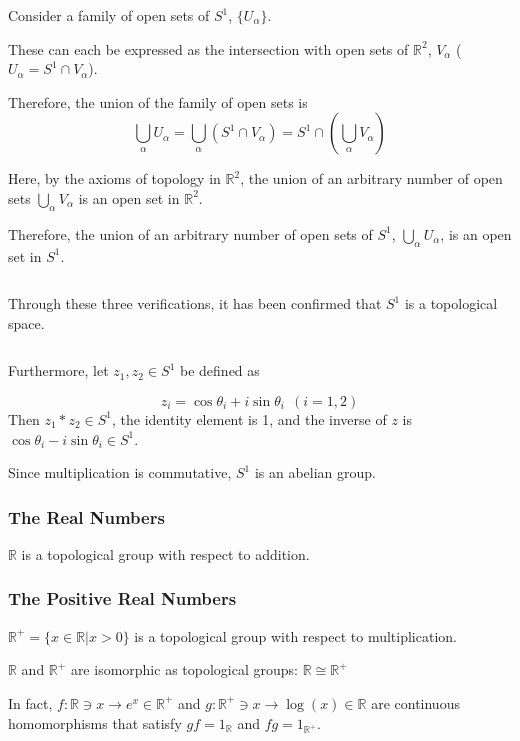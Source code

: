 \documentclass[uplatex,a4j,12pt,dvipdfmx]{jsarticle}
\begin{document}
Consider a family of open sets of $S^{1}$, $\{ U_{\alpha} \}$.

These can each be expressed as the intersection with open sets of $\mathbb{R}^{2}$,
$V_{\alpha}$ ($U_{\alpha}=S^{1} \cap V_{\alpha}$).

Therefore, the union of the family of open sets is
\[
	\bigcup_{\alpha} U_{\alpha}
	=
	\bigcup_{\alpha} (S^{1} \cap V_{\alpha})
	=
	S^{1} \cap \left( \bigcup_{\alpha} V_{\alpha} \right)
\]

Here, by the axioms of topology in $\mathbb{R}^{2}$,
the union of an arbitrary number of open sets
$\bigcup_{\alpha} V_{\alpha}$
is an open set in $\mathbb{R}^{2}$.

Therefore,
the union of an arbitrary number of open sets of $S^{1}$,
$\bigcup_{\alpha} U_{\alpha}$, is an open set in $S^{1}$.

	${}$

Through these three verifications, it has been confirmed that $S^{1}$ is a topological space.

	${}$

Furthermore, let $z_{1},z_{2} \in S^{1}$ be defined as

\[
	z_{i} = \cos \theta_{i} + i \sin \theta_{i} \ \ (i=1,2)
\]
Then $z_{1} * z_{2} \in S^{1}$, the identity element is 1, and the inverse of $z$ is $\cos \theta_{i} - i \sin \theta_{i} \in S^{1}$.

Since multiplication is commutative, $S^{1}$ is an abelian group.

\subsubsection{The Real Numbers}

$\mathbb{R}$ is a topological group with respect to addition.

\subsubsection{The Positive Real Numbers}

$\mathbb{R}^{+} = \{ x \in \mathbb{R} | x > 0 \}$
is a topological group with respect to multiplication.

$\mathbb{R}$ and $\mathbb{R}^{+}$ are isomorphic as topological groups: $\mathbb{R} \cong \mathbb{R}^{+}$

In fact,
$f: \mathbb{R} \ni x \to e^{x} \in \mathbb{R}^{+}$
and
$g: \mathbb{R}^{+} \ni x \to \log(x) \in \mathbb{R}$
are
continuous homomorphisms that satisfy
$gf=1_{\mathbb{R}}$ and
$fg=1_{\mathbb{R}^{+}}$.
\end{document}
